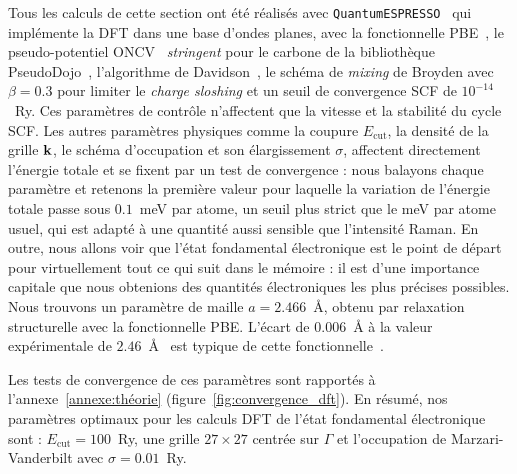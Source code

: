 Tous les calculs de cette section ont été réalisés avec \texttt{QuantumESPRESSO}~\cite{giannozziQUANTUMESPRESSOModular2009,giannozziAdvancedCapabilitiesMaterials2017,giannozziQuantumESPRESSOExascale2020} qui implémente la DFT dans une base d'ondes planes, avec la fonctionnelle PBE~\cite{perdewGeneralizedGradientApproximation1996a}, le pseudo-potentiel ONCV~\cite{hamannOptimizedNormconservingVanderbilt2013} \textit{stringent} pour le carbone de la bibliothèque PseudoDojo~\cite{vansettenPseudoDojoTrainingGrading2018}, l'algorithme de Davidson~\cite{davidsonIterativeCalculationFew1975}, le schéma de \textit{mixing} de Broyden avec $\beta=0.3$ pour limiter le \textit{charge sloshing} et un seuil de convergence SCF de $10^{-14}$~Ry.  Ces paramètres de contrôle n'affectent que la vitesse et la stabilité du cycle SCF. Les autres paramètres physiques comme la coupure $E_\text{cut}$, la densité de la grille $\mathbf{k}$, le schéma d'occupation et son élargissement $\sigma$, affectent directement l'énergie totale et se fixent par un test de convergence : nous balayons chaque paramètre et retenons la première valeur pour laquelle la variation de l'énergie totale passe sous $0.1$~meV par atome, un seuil plus strict que le meV par atome usuel, qui est adapté à une quantité aussi sensible que l'intensité Raman. En outre, nous allons voir que l'état fondamental électronique est le point de départ pour virtuellement tout ce qui suit dans le mémoire : il est d'une importance capitale que nous obtenions des quantités électroniques les plus précises possibles. Nous trouvons un paramètre de maille $a = 2.466$~\AA, obtenu par relaxation structurelle avec la fonctionnelle PBE. L'écart de $0.006$~\AA{} à la valeur expérimentale de $2.46$~\AA~\cite{bosakElasticitySinglecrystallineGraphite2007a} est typique de cette fonctionnelle~\cite{mounetFirstprinciplesDeterminationStructural2005a}.

Les tests de convergence de ces paramètres sont rapportés à l'annexe~\ref{annexe:théorie} (figure~\ref{fig:convergence_dft}). En résumé, nos paramètres optimaux pour les calculs DFT de l'état fondamental électronique sont : $E_\text{cut}=100$~Ry, une grille $27\times 27$ centrée sur $\Gamma$ et l'occupation de Marzari-Vanderbilt avec $\sigma=0.01$~Ry.

